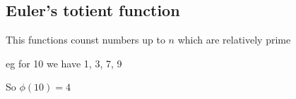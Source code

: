 
\subsection{Euler's totient function}

This functions counst numbers up to \(n\) which are relatively prime

eg for 10 we have 1, 3, 7, 9

So \(\phi (10)=4\)

